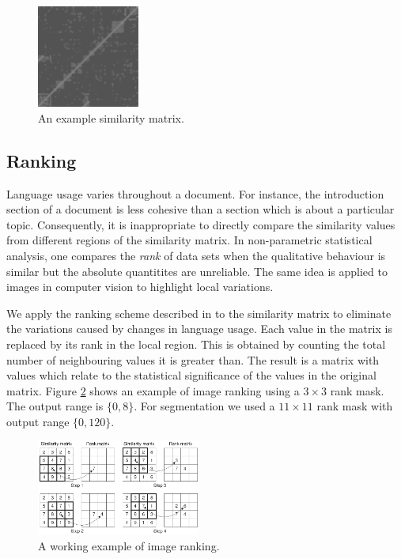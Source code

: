 \documentclass[11pt]{article}
\begin{document}
\begin{figure}[h]
\begin{center}
\includegraphics[width=0.3\textwidth]{simMatrix.eps}
\end{center}
\caption{An example similarity matrix.}
\label{fig:simmatrix}
\end{figure}

\subsection{Ranking}
Language usage varies throughout a document. For instance, the introduction section of a document is less cohesive than a section which is about a particular topic. Consequently, it is inappropriate to directly compare the similarity values from different regions of the similarity matrix. In non-parametric statistical analysis, one compares the {\it rank} of data sets when the qualitative behaviour is similar but the absolute quantitites are unreliable. The same idea is applied to images in computer vision to highlight local variations.

We apply the ranking scheme described in \cite{oneil_denos_1992} to the similarity matrix to eliminate the variations caused by changes in language usage. Each value in the matrix is replaced by its rank in the local region. This is obtained by counting the total number of neighbouring values it is greater than. The result is a matrix with values which relate to the statistical significance of the values in the original matrix. Figure \ref{fig:rank} shows an example of image ranking using a $3 \times 3$ rank mask. The output range is $\{0,8\}$. For segmentation we used a $11 \times 11$ rank mask with output range $\{0,120\}$.

\begin{figure}[h]
\begin{center}
\includegraphics[width=0.48\textwidth]{ranking.eps}
\end{center}
\caption{A working example of image ranking.}
\label{fig:rank}
\end{figure}
\end{document}
